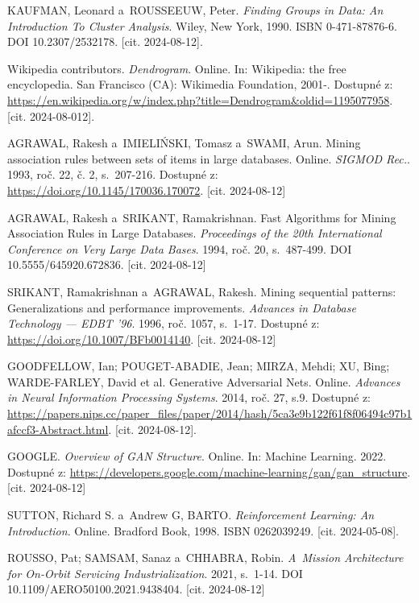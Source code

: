 KAUFMAN, Leonard a~ROUSSEEUW, Peter. \textit{Finding Groups in Data: An Introduction To Cluster Analysis}. Wiley, New York, 1990. ISBN 0-471-87876-6. DOI 10.2307/2532178. [cit. 2024-08-12].

Wikipedia contributors. \textit{Dendrogram}. Online. In: Wikipedia: the free encyclopedia. San Francisco (CA): Wikimedia Foundation, 2001-. Dostupné z: \url{https://en.wikipedia.org/w/index.php?title=Dendrogram&oldid=1195077958}. [cit. 2024-08-012].

AGRAWAL, Rakesh a~IMIELI\'{N}SKI, Tomasz a~SWAMI, Arun. Mining association rules between sets of items in large databases. Online. \textit{SIGMOD Rec.}. 1993, roč. 22, č. 2, s.~207-216. Dostupné z: \url{https://doi.org/10.1145/170036.170072}. [cit. 2024-08-12]

AGRAWAL, Rakesh a~SRIKANT, Ramakrishnan. Fast Algorithms for Mining Association Rules in Large Databases. \textit{Proceedings of the 20th International Conference on Very Large Data Bases}. 1994, roč. 20, s.~487-499. DOI 10.5555/645920.672836. [cit. 2024-08-12]

SRIKANT, Ramakrishnan a~AGRAWAL, Rakesh. Mining sequential patterns: Generalizations and performance improvements. \textit{Advances in Database Technology — EDBT '96}. 1996, roč. 1057, s.~1-17. Dostupné z: \url{https://doi.org/10.1007/BFb0014140}. [cit. 2024-08-12]

GOODFELLOW, Ian; POUGET-ABADIE, Jean; MIRZA, Mehdi; XU, Bing; WARDE-FARLEY, David et al. Generative Adversarial Nets. Online. \textit{Advances in Neural Information Processing Systems}. 2014, roč. 27, s.9. Dostupné z: \url{https://papers.nips.cc/paper_files/paper/2014/hash/5ca3e9b122f61f8f06494c97b1afccf3-Abstract.html}. [cit. 2024-08-12].

GOOGLE. \textit{Overview of GAN Structure}. Online. In: Machine Learning. 2022. Dostupné z: \url{https://developers.google.com/machine-learning/gan/gan_structure}. [cit. 2024-08-12] 

SUTTON, Richard S. a~Andrew G, BARTO. \textit{Reinforcement Learning: An Introduction}. Online. Bradford
Book, 1998. ISBN 0262039249. [cit. 2024-05-08].

ROUSSO, Pat; SAMSAM, Sanaz a~CHHABRA, Robin. \textit{A~Mission Architecture for On-Orbit Servicing Industrialization}. 2021, s.~1-14. DOI 10.1109/AERO50100.2021.9438404. [cit. 2024-08-12]

